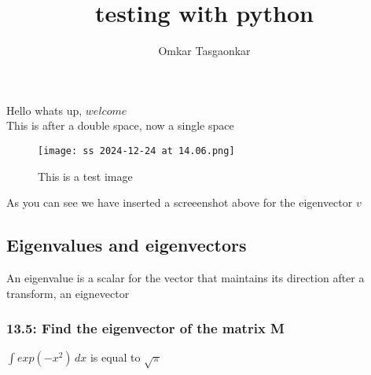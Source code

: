 \documentclass{article}
\title{testing with python}
\author{Omkar Tasgaonkar}
\begin{document}
\maketitle
\tableofcontents
\listoffigures
\pagebreak
Hello whats up, $welcome$\\

This is after a double space, now a single space

\begin{figure}[h]
\caption{This is a test image}
\centering
\texttt{[image: ss 2024-12-24 at 14.06.png]}
\end{figure}

As you can see we have inserted a screeenshot above for the eigenvector $v$\\



\subsection{Eigenvalues and eigenvectors}
An eigenvalue is a scalar for the vector that maintains its direction after a transform, an eignevector

\subsubsection{13.5: Find the eigenvector of the matrix M}
\(\int exp(-x^2) \,dx \) is equal to $\sqrt\pi$
\end{document}
